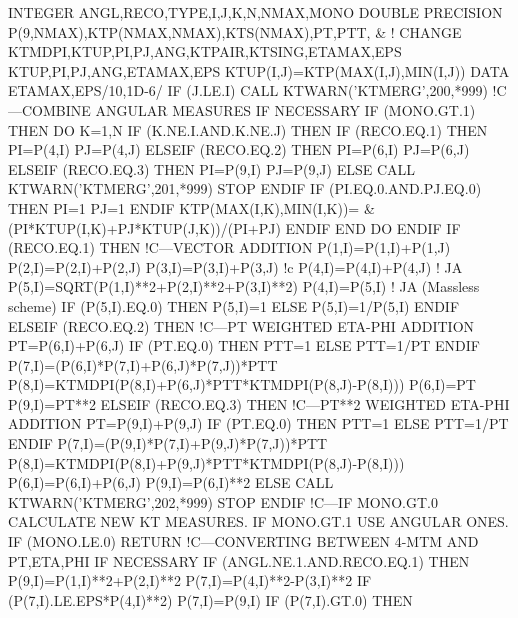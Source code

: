      INTEGER ANGL,RECO,TYPE,I,J,K,N,NMAX,MONO
      DOUBLE PRECISION P(9,NMAX),KTP(NMAX,NMAX),KTS(NMAX),PT,PTT, &
! CHANGE           KTMDPI,KTUP,PI,PJ,ANG,KTPAIR,KTSING,ETAMAX,EPS
           KTUP,PI,PJ,ANG,ETAMAX,EPS
      KTUP(I,J)=KTP(MAX(I,J),MIN(I,J))
      DATA ETAMAX,EPS/10,1D-6/
      IF (J.LE.I) CALL KTWARN('KTMERG',200,*999)
!C---COMBINE ANGULAR MEASURES IF NECESSARY
      IF (MONO.GT.1) THEN
         DO K=1,N
            IF (K.NE.I.AND.K.NE.J) THEN
               IF (RECO.EQ.1) THEN
                  PI=P(4,I)
                  PJ=P(4,J)
               ELSEIF (RECO.EQ.2) THEN
                  PI=P(6,I)
                  PJ=P(6,J)
               ELSEIF (RECO.EQ.3) THEN
                  PI=P(9,I)
                  PJ=P(9,J)
               ELSE
                  CALL KTWARN('KTMERG',201,*999)
                  STOP
               ENDIF
               IF (PI.EQ.0.AND.PJ.EQ.0) THEN
                  PI=1
                  PJ=1
               ENDIF
               KTP(MAX(I,K),MIN(I,K))= &
                    (PI*KTUP(I,K)+PJ*KTUP(J,K))/(PI+PJ)
            ENDIF
         END DO
      ENDIF
      IF (RECO.EQ.1) THEN
!C---VECTOR ADDITION
         P(1,I)=P(1,I)+P(1,J)
         P(2,I)=P(2,I)+P(2,J)
         P(3,I)=P(3,I)+P(3,J)
!c         P(4,I)=P(4,I)+P(4,J) ! JA
         P(5,I)=SQRT(P(1,I)**2+P(2,I)**2+P(3,I)**2)
         P(4,I)=P(5,I) ! JA (Massless scheme)
         IF (P(5,I).EQ.0) THEN
            P(5,I)=1
         ELSE
            P(5,I)=1/P(5,I)
         ENDIF
      ELSEIF (RECO.EQ.2) THEN
!C---PT WEIGHTED ETA-PHI ADDITION
         PT=P(6,I)+P(6,J)
         IF (PT.EQ.0) THEN
            PTT=1
         ELSE
            PTT=1/PT
         ENDIF
         P(7,I)=(P(6,I)*P(7,I)+P(6,J)*P(7,J))*PTT
         P(8,I)=KTMDPI(P(8,I)+P(6,J)*PTT*KTMDPI(P(8,J)-P(8,I)))
         P(6,I)=PT
         P(9,I)=PT**2
      ELSEIF (RECO.EQ.3) THEN
!C---PT**2 WEIGHTED ETA-PHI ADDITION
         PT=P(9,I)+P(9,J)
         IF (PT.EQ.0) THEN
            PTT=1
         ELSE
            PTT=1/PT
         ENDIF
         P(7,I)=(P(9,I)*P(7,I)+P(9,J)*P(7,J))*PTT
         P(8,I)=KTMDPI(P(8,I)+P(9,J)*PTT*KTMDPI(P(8,J)-P(8,I)))
         P(6,I)=P(6,I)+P(6,J)
         P(9,I)=P(6,I)**2
      ELSE
         CALL KTWARN('KTMERG',202,*999)
         STOP
      ENDIF
!C---IF MONO.GT.0 CALCULATE NEW KT MEASURES. IF MONO.GT.1 USE ANGULAR ONES.
      IF (MONO.LE.0) RETURN
!C---CONVERTING BETWEEN 4-MTM AND PT,ETA,PHI IF NECESSARY
      IF (ANGL.NE.1.AND.RECO.EQ.1) THEN
         P(9,I)=P(1,I)**2+P(2,I)**2
         P(7,I)=P(4,I)**2-P(3,I)**2
         IF (P(7,I).LE.EPS*P(4,I)**2) P(7,I)=P(9,I)
         IF (P(7,I).GT.0) THEN
